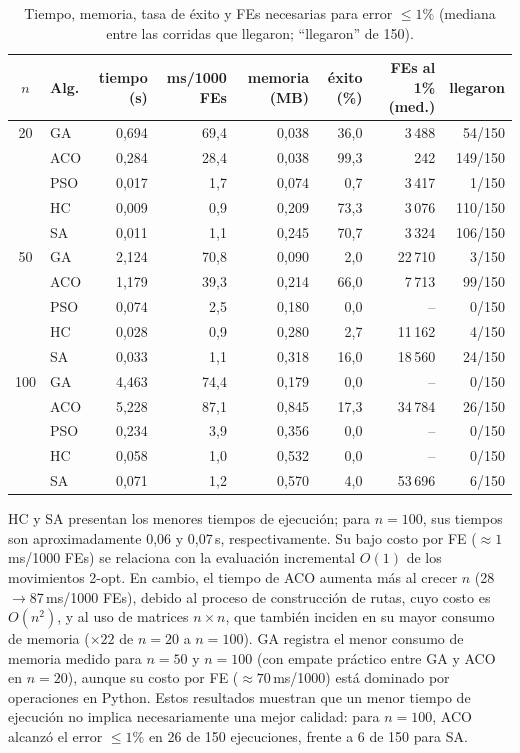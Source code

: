 \documentclass[10pt,a4paper]{article}
\begin{document}
\begin{table}[H]\centering\small
\begin{tabular}{clrrrrrr}
\toprule
$n$ & Alg. & tiempo (s) & ms/1000 FEs & memoria (MB) & éxito (\%) & FEs al 1\% (med.) & llegaron \\
\midrule
20 & GA & 0{,}694 & 69{,}4 & 0{,}038 & 36{,}0 & 3\,488 & 54/150 \\
 & ACO & 0{,}284 & 28{,}4 & 0{,}038 & 99{,}3 & 242 & 149/150 \\
 & PSO & 0{,}017 & 1{,}7 & 0{,}074 & 0{,}7 & 3\,417 & 1/150 \\
 & HC & 0{,}009 & 0{,}9 & 0{,}209 & 73{,}3 & 3\,076 & 110/150 \\
 & SA & 0{,}011 & 1{,}1 & 0{,}245 & 70{,}7 & 3\,324 & 106/150 \\
\midrule
50 & GA & 2{,}124 & 70{,}8 & 0{,}090 & 2{,}0 & 22\,710 & 3/150 \\
 & ACO & 1{,}179 & 39{,}3 & 0{,}214 & 66{,}0 & 7\,713 & 99/150 \\
 & PSO & 0{,}074 & 2{,}5 & 0{,}180 & 0{,}0 & -- & 0/150 \\
 & HC & 0{,}028 & 0{,}9 & 0{,}280 & 2{,}7 & 11\,162 & 4/150 \\
 & SA & 0{,}033 & 1{,}1 & 0{,}318 & 16{,}0 & 18\,560 & 24/150 \\
\midrule
100 & GA & 4{,}463 & 74{,}4 & 0{,}179 & 0{,}0 & -- & 0/150 \\
 & ACO & 5{,}228 & 87{,}1 & 0{,}845 & 17{,}3 & 34\,784 & 26/150 \\
 & PSO & 0{,}234 & 3{,}9 & 0{,}356 & 0{,}0 & -- & 0/150 \\
 & HC & 0{,}058 & 1{,}0 & 0{,}532 & 0{,}0 & -- & 0/150 \\
 & SA & 0{,}071 & 1{,}2 & 0{,}570 & 4{,}0 & 53\,696 & 6/150 \\
\bottomrule
\end{tabular}

\caption{Tiempo, memoria, tasa de éxito y FEs necesarias para error $\le1\text{\%}$ (mediana entre las corridas que llegaron; ``llegaron'' de 150).}\label{tab:ef}
\end{table}
HC y SA presentan los menores tiempos de ejecución; para $n=100$, sus tiempos son aproximadamente 0{,}06 y 0{,}07\,s, respectivamente. Su bajo costo por FE ($\approx1$\,ms/1000 FEs) se relaciona con la evaluación incremental $O(1)$ de los movimientos 2-opt.
En cambio, el tiempo de ACO aumenta más al crecer $n$ (28$\to$87\,ms/1000 FEs), debido al proceso de construcción de rutas, cuyo costo es $O(n^2)$, y al uso de matrices $n\times n$, que también inciden en su mayor consumo de memoria ($\times22$ de $n=20$ a $n=100$).
GA registra el menor consumo de memoria medido para $n=50$ y $n=100$ (con empate práctico entre GA y ACO en $n=20$), aunque su costo por FE ($\approx70$\,ms/1000) está dominado por operaciones en Python. Estos resultados muestran que un menor tiempo de ejecución no implica necesariamente una mejor calidad: para $n=100$, ACO alcanzó el error $\le1\text{\%}$ en 26 de 150 ejecuciones, frente a 6 de 150 para SA.
\end{document}
